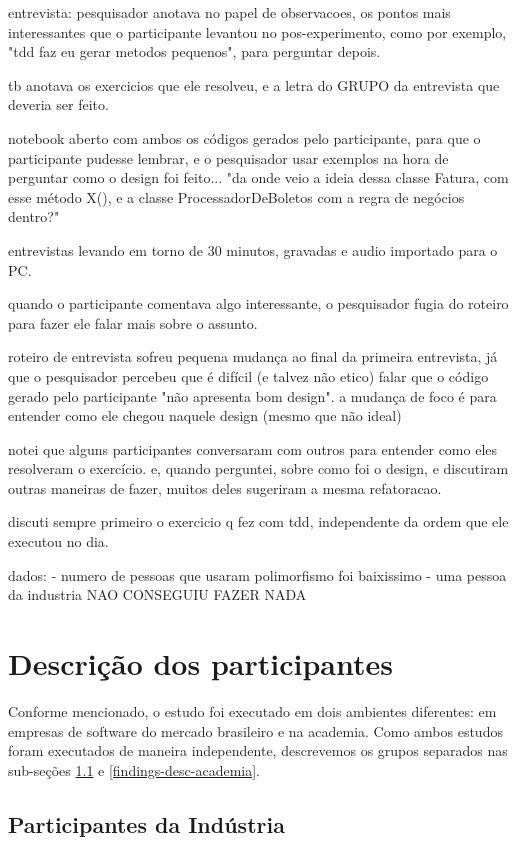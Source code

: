 entrevista:
pesquisador anotava no papel de observacoes, os pontos mais interessantes que o participante levantou no pos-experimento,
como por exemplo, "tdd faz eu gerar metodos pequenos", para perguntar depois.

tb anotava os exercicios que ele resolveu, e a letra do GRUPO da entrevista que deveria ser feito.

notebook aberto com ambos os códigos gerados pelo participante, para que o participante pudesse lembrar,
e o pesquisador usar exemplos na hora de perguntar como o design foi feito... "da onde veio a ideia dessa classe
Fatura, com esse método X(), e a classe ProcessadorDeBoletos com a regra de negócios dentro?"

entrevistas levando em torno de 30 minutos, gravadas e audio importado para o PC.

quando o participante comentava algo interessante, o pesquisador fugia do roteiro para fazer ele falar mais sobre o assunto.

roteiro de entrevista sofreu pequena mudança ao final da primeira entrevista, já que o pesquisador percebeu que
é difícil (e talvez não etico) falar que o código gerado pelo participante "não apresenta bom design". a mudança de foco
é para entender como ele chegou naquele design (mesmo que não ideal)

notei que alguns participantes conversaram com outros para entender como eles resolveram o exercício. e, quando perguntei,
sobre como foi o design, e discutiram outras maneiras de fazer, muitos deles sugeriram a mesma refatoracao.

discuti sempre primeiro o exercicio q fez com tdd, independente da ordem que
ele executou no dia.

dados:
- numero de pessoas que usaram polimorfismo foi baixissimo
- uma pessoa da industria NAO CONSEGUIU FAZER NADA


\section{Descrição dos participantes}

Conforme mencionado, o estudo foi executado em dois ambientes diferentes: em empresas de software
do mercado brasileiro e na academia. Como ambos estudos foram executados de maneira independente,
descrevemos os grupos separados nas sub-seções \ref{findings-desc-industria} e \ref{findings-desc-academia}.

\subsection{Participantes da Indústria}
\label{findings-desc-industria}

